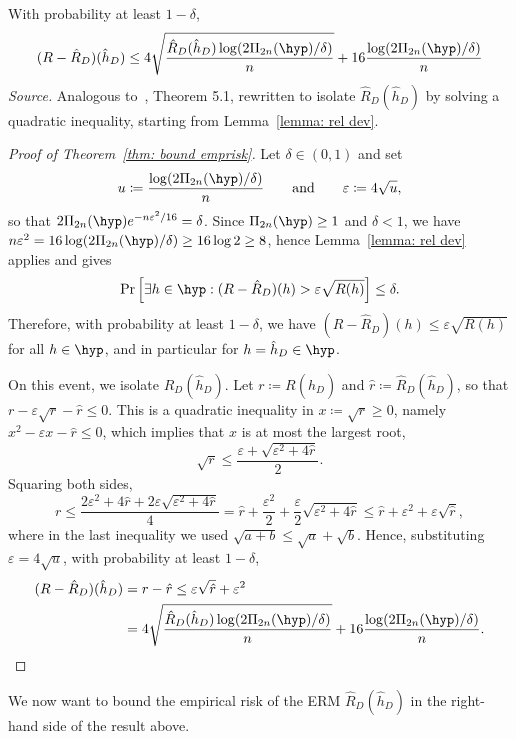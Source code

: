 \documentclass[reqno]{amsart}
\begin{document}
\begin{theorem}\label{thm: bound emprisk}
    With probability at least $1-\delta$,
    \[
    (R - \hat R_D)(\hat h_D) \le 4\sqrt{\frac{\hat R_D(\hat h_D)\log(2\Pi_{2n}(\hyp)/\delta)}{n}} + 16\frac{\log(2\Pi_{2n}(\hyp)/\delta)}{n}
    \]
\textnormal{\emph{Source.} Analogous to~\cite{boucheron2005theory}, Theorem 5.1, rewritten to isolate $\hat R_D(\hat h_D)$ by solving a quadratic inequality, starting from Lemma~\ref{lemma: rel dev}.}

\begin{proof}[Proof of Theorem~\ref{thm: bound emprisk}]
Let $\delta\in(0,1)$ and set
\[
u\coloneq\frac{\log(2\Pi_{2n}(\hyp)/\delta)}{n} \qquad\text{and}\qquad \varepsilon\coloneq 4\sqrt{u},
\]
so that $2\Pi_{2n}(\hyp)e^{-n\varepsilon^2/16} = \delta$. Since $\Pi_{2n}(\hyp)\ge1$ and $\delta<1$, we have $n\varepsilon^2 = 16\log(2\Pi_{2n}(\hyp)/\delta) \ge 16\log 2 \ge 8$, hence Lemma~\ref{lemma: rel dev} applies and gives
\[
\Pr\left[\exists h\in\hyp : (R-\hat R_D)(h) > \varepsilon\sqrt{R(h)}\right] \le \delta.
\]
Therefore, with probability at least $1-\delta$, we have $(R-\hat R_D)(h)\le\varepsilon\sqrt{R(h)}$ for all $h\in\hyp$, and in particular for $h=\hat h_D\in\hyp$.

On this event, we isolate $\hat R_D(\hat h_D)$. Let $r\coloneq R(\hat h_D)$ and $\hat r\coloneq\hat R_D(\hat h_D)$, so that $r-\varepsilon\sqrt r-\hat r\le0$. This is a quadratic inequality in $x\coloneq\sqrt r\ge0$, namely $x^2-\varepsilon x-\hat r\le0$, which implies that $x$ is at most the largest root,
\[
\sqrt r \le \frac{\varepsilon+\sqrt{\varepsilon^2+4\hat r}}{2}.
\]
Squaring both sides,
\[
r \le \frac{2\varepsilon^2 + 4\hat r + 2\varepsilon\sqrt{\varepsilon^2+4\hat r}}{4} = \hat r + \frac{\varepsilon^2}{2} + \frac{\varepsilon}{2}\sqrt{\varepsilon^2+4\hat r} \le \hat r + \varepsilon^2 + \varepsilon\sqrt{\hat r},
\]
where in the last inequality we used $\sqrt{a+b}\le\sqrt a+\sqrt b$. Hence, substituting $\varepsilon = 4\sqrt u$, with probability at least $1-\delta$,
\begin{align*}
(R-\hat R_D)(\hat h_D) &= r-\hat r \le \varepsilon\sqrt{\hat r} + \varepsilon^2 \\ &= 4\sqrt{\frac{\hat R_D(\hat h_D)\log(2\Pi_{2n}(\hyp)/\delta)}{n}} + 16\frac{\log(2\Pi_{2n}(\hyp)/\delta)}{n}.
\end{align*}
\end{proof}
\end{theorem}

We now want to bound the empirical risk of the ERM $\hat R_D(\hat h_D)$ in the right-hand side of the result above. 
\end{document}
